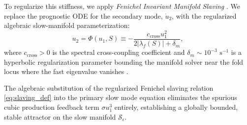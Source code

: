 To regularize this stiffness, we apply \textit{Fenichel Invariant Manifold Slaving} \cite{fenichel1979}. We replace the prognostic ODE for the secondary mode, $\dot{u}_2$, with the regularized algebraic slow-manifold parameterization:
\begin{equation}
    u_2 = \Phi(u_1, S) \equiv -\frac{c_{\text{cross}} u_1^2}{2 \left| \lambda_f(S) \right| + \delta_m}, \label{eq:slaving_def}
\end{equation}
where $c_{\text{cross}} > 0$ is the spectral cross-coupling coefficient and $\delta_m \sim 10^{-3}\text{ s}^{-1}$ is a hyperbolic regularization parameter bounding the manifold solver near the fold locus where the fast eigenvalue vanishes \cite{fenichel1979}.

\begin{theorem}
\label{thm:fenichel_boundedness}
The algebraic substitution of the regularized Fenichel slaving relation \eqref{eq:slaving_def} into the primary slow mode equation eliminates the spurious cubic production feedback term $\sigma u_1^3$ entirely, establishing a globally bounded, stable attractor on the slow manifold $\mathcal{S}_\epsilon$.
\end{theorem}

